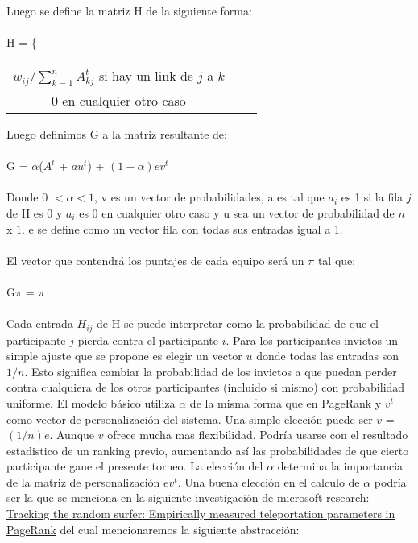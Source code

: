 Luego se define la matriz H de la siguiente forma:
\\\\
H = \Bigg\{
  \begin{tabular}{ccc}
  $w_{ij} / \sum\limits_{k=1}^n A^t_{kj} $ si hay un link de $j$ a $k$ \\
  0 en cualquier otro caso 
  \end{tabular}

Luego definimos G a la matriz resultante de:
\\\\
G = $\alpha$($A^t$ + $au^t$) + $(1 - \alpha)ev^t$
\\\\
Donde 0 $< \alpha < 1$, v es un vector de probabilidades, a es tal que $a_i$ es 1 si la fila $j$ de H es 0 y $a_i$ es 0 en cualquier otro caso y u sea un vector de probabilidad de $n$ x $1$. e se define como un vector fila con todas sus entradas igual a 1.
\\\\
El vector que contendrá los puntajes de cada equipo será un $\pi$ tal que:
\\\\
G$\pi$ = $\pi$ 
\\\\
Cada entrada $H_{ij}$ de H se puede interpretar como la probabilidad de que el participante $j$ pierda contra el participante $i$. Para los participantes invictos un simple ajuste que se propone es elegir un vector $u$ donde todas las entradas son $1/n$. Esto significa cambiar la probabilidad de los invictos a que puedan perder contra cualquiera de los otros participantes (incluido si mismo) con probabilidad uniforme.
El modelo básico utiliza $\alpha$ de la misma forma que en PageRank y $v^t$ como vector de personalización del sistema. Una simple elección puede ser $v$ = $(1/n)e$. Aunque $v$ ofrece mucha mas flexibilidad. Podría usarse con el resultado estadistico de un ranking previo, aumentando así las probabilidades de que cierto participante gane el presente torneo.
La elección del $\alpha$ determina la importancia de la matriz de personalización $ev^t$. Una buena elección en el calculo de $\alpha$ podría ser la que se menciona en la siguiente investigación de microsoft research: \href{http://research.microsoft.com/apps/pubs/default.aspx?id=118374}{
Tracking the random surfer: Empirically measured teleportation parameters in PageRank} del cual mencionaremos la siguiente abstracción:

